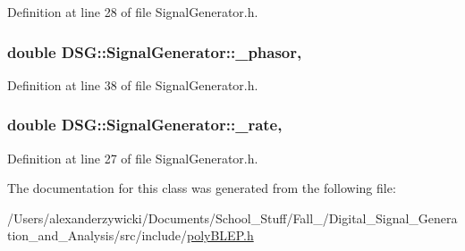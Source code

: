 Definition at line 28 of file Signal\+Generator.\+h.

\hypertarget{classDSG_1_1SignalGenerator_ac2271b582bf699275f077ecb642a8cd9}{
\subsubsection[{\+\_\+phasor}]{\setlength{\rightskip}{0pt plus 5cm}double D\+S\+G\+::\+Signal\+Generator\+::\+\_\+phasor\hspace{0.3cm}{\ttfamily [protected]}, {\ttfamily [inherited]}}}\label{classDSG_1_1SignalGenerator_ac2271b582bf699275f077ecb642a8cd9}


Definition at line 38 of file Signal\+Generator.\+h.

\hypertarget{classDSG_1_1SignalGenerator_aa10f6c85d9adee901139ea7fb346f39d}{
\subsubsection[{\+\_\+rate}]{\setlength{\rightskip}{0pt plus 5cm}double D\+S\+G\+::\+Signal\+Generator\+::\+\_\+rate\hspace{0.3cm}{\ttfamily [protected]}, {\ttfamily [inherited]}}}\label{classDSG_1_1SignalGenerator_aa10f6c85d9adee901139ea7fb346f39d}


Definition at line 27 of file Signal\+Generator.\+h.



The documentation for this class was generated from the following file\+:\begin{DoxyCompactItemize}
\item 
/\+Users/alexanderzywicki/\+Documents/\+School\+\_\+\+Stuff/\+Fall\+\_/\+Digital\+\_\+\+Signal\+\_\+\+Generation\+\_\+and\+\_\+\+Analysis/src/include/\hyperlink{polyBLEP_8h}{poly\+B\+L\+E\+P.\+h}\end{DoxyCompactItemize}
